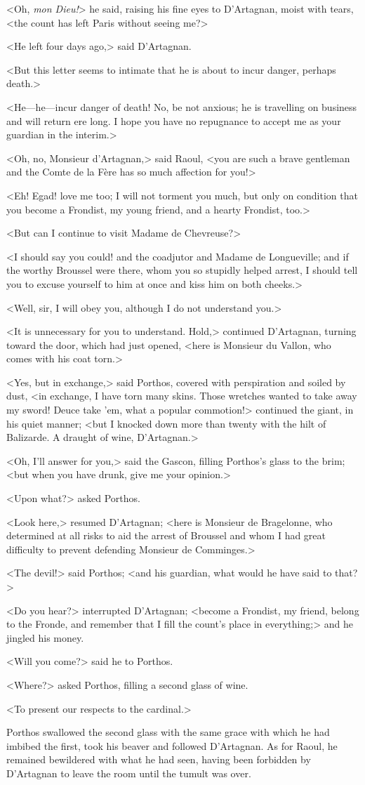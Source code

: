 <Oh, \textit{mon Dieu!}> he said, raising his fine eyes to D'Artagnan, moist with tears, <the count has left Paris without seeing me?>

<He left four days ago,> said D'Artagnan.

<But this letter seems to intimate that he is about to incur danger, perhaps death.>

<He—he—incur danger of death! No, be not anxious; he is travelling on business and will return ere long. I hope you have no repugnance to accept me as your guardian in the interim.>

<Oh, no, Monsieur d'Artagnan,> said Raoul, <you are such a brave gentleman and the Comte de la Fère has so much affection for you!>

<Eh! Egad! love me too; I will not torment you much, but only on condition that you become a Frondist, my young friend, and a hearty Frondist, too.>

<But can I continue to visit Madame de Chevreuse?>

<I should say you could! and the coadjutor and Madame de Longueville; and if the worthy Broussel were there, whom you so stupidly helped arrest, I should tell you to excuse yourself to him at once and kiss him on both cheeks.>

<Well, sir, I will obey you, although I do not understand you.>

<It is unnecessary for you to understand. Hold,> continued D'Artagnan, turning toward the door, which had just opened, <here is Monsieur du Vallon, who comes with his coat torn.>

<Yes, but in exchange,> said Porthos, covered with perspiration and soiled by dust, <in exchange, I have torn many skins. Those wretches wanted to take away my sword! Deuce take 'em, what a popular commotion!> continued the giant, in his quiet manner; <but I knocked down more than twenty with the hilt of Balizarde. A draught of wine, D'Artagnan.>

<Oh, I'll answer for you,> said the Gascon, filling Porthos's glass to the brim; <but when you have drunk, give me your opinion.>

<Upon what?> asked Porthos.

<Look here,> resumed D'Artagnan; <here is Monsieur de Bragelonne, who determined at all risks to aid the arrest of Broussel and whom I had great difficulty to prevent defending Monsieur de Comminges.>

<The devil!> said Porthos; <and his guardian, what would he have said to that?>

<Do you hear?> interrupted D'Artagnan; <become a Frondist, my friend, belong to the Fronde, and remember that I fill the count's place in everything;> and he jingled his money.

<Will you come?> said he to Porthos.

<Where?> asked Porthos, filling a second glass of wine.

<To present our respects to the cardinal.>

Porthos swallowed the second glass with the same grace with which he had imbibed the first, took his beaver and followed D'Artagnan. As for Raoul, he remained bewildered with what he had seen, having been forbidden by D'Artagnan to leave the room until the tumult was over. 